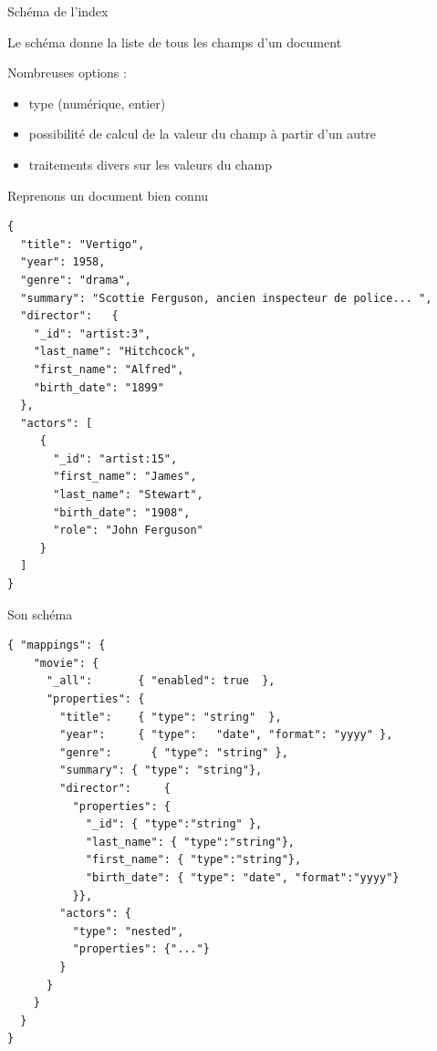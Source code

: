 \begin{frame}{Schéma de l'index }


 Le schéma donne la liste de tous les champs d'un document 

\vfill

Nombreuses options : 
      \begin{itemize}
        \item type (numérique, entier)
        \item possibilité de calcul de la valeur du champ à partir d'un autre
        \item traitements divers sur les valeurs du champ
      \end{itemize}

\end{frame} %

\begin{frame}[fragile]{Reprenons un  document bien connu}
  \begin{verbatim}
{
  "title": "Vertigo",
  "year": 1958,
  "genre": "drama",
  "summary": "Scottie Ferguson, ancien inspecteur de police... ",
  "director": 	{
    "_id": "artist:3",
    "last_name": "Hitchcock",
    "first_name": "Alfred",
    "birth_date": "1899"	
  },
  "actors": [
     {
       "_id": "artist:15",
       "first_name": "James",
       "last_name": "Stewart",
       "birth_date": "1908",
       "role": "John Ferguson"	
     }
  ]
}
\end{verbatim} 
\end{frame}

\begin{frame}[fragile]{Son schéma}
	\begin{verbatim}
{ "mappings": {
    "movie": {
      "_all":       { "enabled": true  },
      "properties": {
        "title":    { "type": "string"  },
        "year":     { "type":   "date", "format": "yyyy" },
        "genre":      { "type": "string" },
        "summary": { "type": "string"},
        "director":     {
          "properties": {
            "_id": { "type":"string" },
            "last_name": { "type":"string"},
            "first_name": { "type":"string"},
            "birth_date": { "type": "date", "format":"yyyy"}
          }},
        "actors": { 
          "type": "nested",
          "properties": {"..."}
        }
      }
    }
  }
}
  \end{verbatim}
\end{frame}

